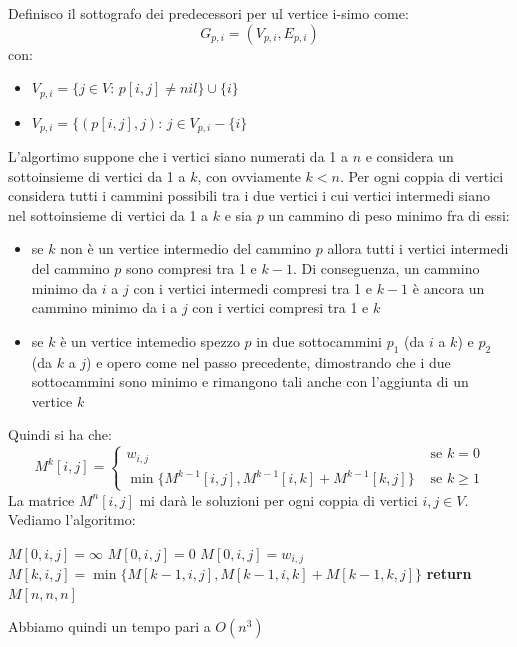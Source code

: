 \documentclass[a4paper,12pt, oneside]{book}
\begin{document}
Definisco il sottografo dei predecessori per ul vertice i-simo come:
\[G_{p,i}=(V_{p,i},E_{p,i})\]
con:
\begin{itemize}
  \item $V_{p,i}=\{j\in V:\,p[i,j]\neq nil\}\cup\{i\}$
  \item $V_{p,i}=\{(p[i,j],j):\,j\in V_{p,i}-\{i\}$
\end{itemize}
L'algortimo suppone che i vertici siano numerati da 1 a $n$ e
considera un sottoinsieme di vertici da 1 a $k$, con ovviamente
$k<n$. Per ogni coppia di vertici considera tutti i cammini possibili
tra i due vertici i cui vertici intermedi siano nel sottoinsieme di
vertici da 1 a $k$ e sia $p$ un cammino di peso minimo fra di essi:
\begin{itemize}
  \item se $k$ non è un vertice intermedio del cammino $p$ allora
  tutti i vertici intermedi del cammino $p$ sono compresi tra 1 e
  $k−1$. Di conseguenza, un cammino minimo da $i$ a $j$ con i vertici
  intermedi compresi tra 1 e $k − 1$ è ancora un cammino minimo da i a
  $j$ con i vertici compresi tra 1 e $k$
  \item se $k$ è un vertice intemedio spezzo $p$ in due sottocammini
  $p_1$ (da $i$ a $k$) e $p_2$ (da $k$ a $j$) e opero come nel passo
  precedente, dimostrando che i due sottocammini sono
  minimo e rimangono tali anche con l’aggiunta di un vertice $k$
\end{itemize}
Quindi si ha che:
\[M^k[i,j]=
  \begin{cases}
    w_{i,j} & \mbox{ se } k=0\\
    \min\{M^{k-1}[i,j], M^{k-1}[i,k]+M^{k-1}[k,j]\}  & \mbox{ se }
    k\geq 1
  \end{cases}
\]
La matrice $M^n[i,j]$ mi darà le soluzioni per ogni coppia di vertici
$i,j\in V$.
Vediamo l'algoritmo:
\begin{algorithm}
  \begin{algorithmic}
    \State $M[0,i,j]=\infty$
    \Else
    \State $M[0,i,j]=0$
    \Else
    \State $M[0,i,j]=w_{i,j}$
    \EndIf
    \EndIf
    \EndFor
    \EndFor
    \State $M[k,i,j]=\min\{M[k-1,i,j],M[k-1,i,k]+M[k-1,k,j]\}$
    \EndFor
    \EndFor
    \EndFor
    \State \textbf{return} $M[n,n,n]$
    \EndFunction
  \end{algorithmic}
\end{algorithm}
Abbiamo quindi un tempo pari a $O(n^3)$
\newpage
\end{document}
